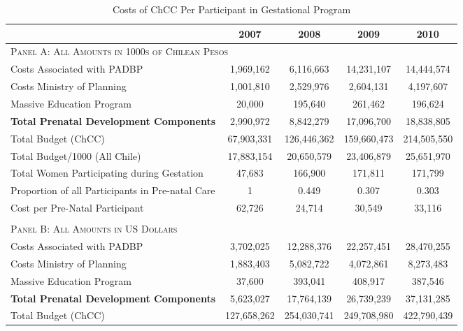 \documentclass[12pt]{article}
\begin{document}
\begin{spacing}{1.4}

\begin{table}[htpb!]
  \caption{Costs of ChCC Per Participant in Gestational Program}
  \label{tab:spending}
  \begin{tabular}{lcccc} \toprule
    &2007&2008&2009&2010 \\ \midrule
    \multicolumn{5}{l}{\textsc{Panel A: All Amounts in 1000s of Chilean Pesos}} \\
    Costs Associated with PADBP&1,969,162&6,116,663&14,231,107&14,444,574\\
    Costs Ministry of Planning &1,001,810&2,529,976&2,604,131&4,197,607\\
    Massive Education Program &20,000&195,640&261,462&196,624\\
    \textbf{Total Prenatal Development Components} &2,990,972&8,842,279&17,096,700&18,838,805\\
    Total Budget (ChCC)&67,903,331&126,446,362&159,660,473&214,505,550\\
    Total Budget/1000 (All Chile)&17,883,154& 20,650,579 & 23,406,879& 25,651,970\\
    Total Women Participating during Gestation &47,683&166,900&171,811&171,799\\
    Proportion of all Participants in Pre-natal Care &1&0.449&0.307&0.303\\
    Cost per Pre-Natal Participant &62,726 & 24,714 & 30,549 & 33,116\\
    &&&&\\
    \multicolumn{5}{l}{\textsc{Panel B: All Amounts in US Dollars}} \\
    Costs Associated with PADBP                    &3,702,025  &12,288,376 &22,257,451&28,470,255\\
    Costs Ministry of Planning                     &1,883,403  &5,082,722  &4,072,861 &8,273,483\\
    Massive Education Program                      &37,600     &393,041    &408,917   &387,546\\
    \textbf{Total Prenatal Development Components} &5,623,027  &17,764,139 &26,739,239&37,131,285\\
    Total Budget (ChCC)                            &127,658,262&254,030,741&249,708,980&422,790,439\\

\end{tabular}
\end{table}
\end{spacing}
\end{document}
